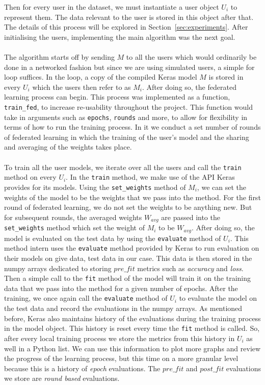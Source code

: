 \documentclass[12pt]{article}
\begin{document}
\noindent Then for every user in the dataset, we must instantiate a user object $U_i$ to represent them. The data relevant to the user is stored in this object after that. The details of this process will be explored in Section~\ref{sec:experiments}. After initialising the users, implementing the main algorithm was the next goal. 
\\\\
The algorithm starts off by sending $M$ to all the users which would ordinarily be done in a networked fashion but since we are using simulated users, a simple for loop suffices. In the loop, a copy of the compiled Keras model $M$ is stored in every $U_i$ which the users then refer to as $M_i$. After doing so, the federated learning process can begin. This process was implemented as a function, \texttt{train\_fed}, to increase re-usability throughout the project. This function would take in arguments such as \texttt{epochs}, \texttt{rounds} and more, to allow for flexibility in terms of how to run the training process. In it we conduct a set number of rounds of federated learning in which the training of the user's model and the sharing and averaging of the weights takes place.
\\\\
To train all the user models, we iterate over all the users and call the \texttt{train} method on every $U_i$. In the \texttt{train} method, we make use of the API Keras provides for its models. Using the \texttt{set\_weights} method of $M_i$, we can set the weights of the model to be the weights that we pass into the method. For the first round of federated learning, we do not set the weights to be anything new. But for subsequent rounds, the averaged weights $W_{avg}$ are passed into the \texttt{set\_weights} method which set the weight of $M_i$ to be $W_{avg}$. After doing so, the model is evaluated on the test data by using the \texttt{evaluate} method of $U_i$. This method intern uses the \texttt{evaluate} method provided by Keras to run evaluation on their models on give data, test data in our case. This data is then stored in the numpy arrays dedicated to storing $pre\_fit$ metrics such as \textit{accuracy} and \textit{loss}. Then a simple call to the \texttt{fit} method of the model will train it on the training data that we pass into the method for a given number of epochs. After the training, we once again call the \texttt{evaluate} method of $U_i$ to evaluate the model on the test data and record the evaluations in the numpy arrays. As mentioned before, Keras also maintains history of the evaluations during the training process in the model object. This history is reset every time the \texttt{fit} method is called. So, after every local training process we store the metrics from this history in $U_i$ as well in a Python list. We can use this information to plot more graphs and review the progress of the learning process, but this time on a more granular level because this is a history of \textit{epoch} evaluations. The $pre\_fit$ and $post\_fit$ evaluations we store are \textit{round based} evaluations.
\end{document}
